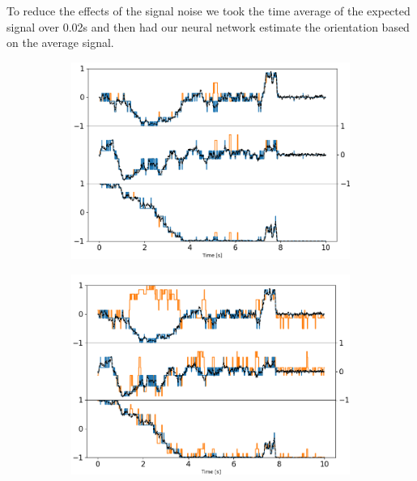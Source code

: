 \documentclass[final,  3p]{elsarticle}
\begin{document}
To reduce the effects of the signal noise we took the time average of the expected signal over 0.02s and then had our neural network estimate the orientation based on the average signal.
\begin{figure}[h]
	\centering
	\begin{subfigure}{0.32\textwidth}
		\subcaption{}
		\includegraphics[width=\textwidth]{./Images/fig11a.png}
	\end{subfigure}
	\begin{subfigure}{0.32\textwidth}
		\subcaption{}
		\includegraphics[width=\textwidth]{./Images/fig11b.png}
	\end{subfigure}
	\begin{subfigure}{0.32\textwidth}
		\subcaption{}

\end{subfigure}
\end{figure}
\end{document}
